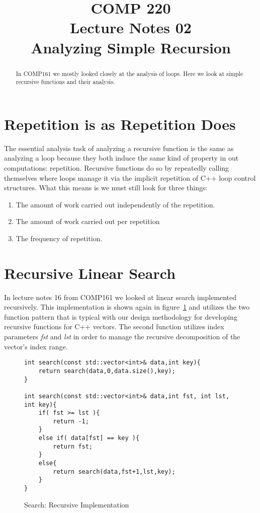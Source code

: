 \documentclass[nobib]{tufte-handout}
\title{COMP 220 \\ Lecture Notes 02 \\ Analyzing Simple Recursion}
\begin{document}
\maketitle

\begin{abstract}
In COMP161 we mostly looked closely at the analysis of loops. Here we look at simple recursive functions and their analysis.
\end{abstract}

\section{Repetition is as Repetition Does}

The essential analysis task of analyzing a recursive function is the same as analyzing a loop because they both induce the same kind of property in out computations: repetition. Recursive functions do so by repeatedly calling themselves where loops manage it via the implicit repetition of C++ loop control structures. What this means is we must still look for three things:
\begin{enumerate}
  \item The amount of work carried out independently of the repetition.
  \item The amount of work carried out per repetition
  \item The frequency of repetition.
\end{enumerate}

\section{Recursive Linear Search}

In lecture notes 16 from COMP161 we looked at linear search implemented recursively. This implementation is shown again in figure~\ref{code:searchrec} and utilizes the two function pattern that is typical with our design methodology for developing recursive functions for C++ vectors. The second function utilizes index parameters \textit{fst} and \textit{lst} in order to manage the recursive decomposition of the vector's index range.

\begin{figure}[htpb!]
\begin{lstlisting}
int search(const std::vector<int>& data,int key){
	return search(data,0,data.size(),key);
}

int search(const std::vector<int>& data,int fst, int lst, int key){
	if( fst >= lst ){
		return -1;
	}
	else if( data[fst] == key ){
		return fst;
	}
	else{
		return search(data,fst+1,lst,key);
	}
}
\end{lstlisting}
\label{code:searchrec}
\caption{Search: Recursive Implementation}
\end{figure}
\end{document}
